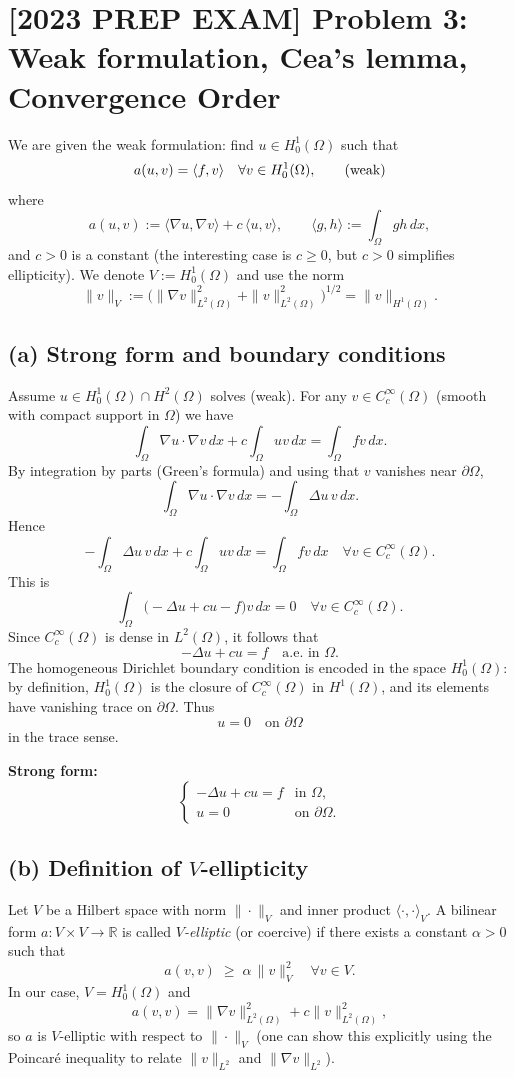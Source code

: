 \section*{[2023 PREP EXAM] Problem 3: Weak formulation, Cea's lemma, Convergence Order}
We are given the weak formulation: find $u \in H^1_0(\Omega)$ such that
\[
  a(u,v) = \langle f,v\rangle
  \quad \forall v \in H^1_0(\Omega), \tag{\text{weak}}
\]
where
\[
  a(u,v) := \langle \nabla u,\nabla v\rangle + c \,\langle u,v\rangle,
  \qquad
  \langle g,h\rangle := \int_\Omega g h \, dx,
\]
and $c > 0$ is a constant (the interesting case is $c \ge 0$, but $c>0$ simplifies
ellipticity).
We denote $V := H^1_0(\Omega)$ and use the norm
\[
  \|v\|_V := \bigl(\|\nabla v\|_{L^2(\Omega)}^2 + \|v\|_{L^2(\Omega)}^2\bigr)^{1/2}
  = \|v\|_{H^1(\Omega)}.
\]
\subsection*{(a) Strong form and boundary conditions}
Assume $u \in H^1_0(\Omega) \cap H^2(\Omega)$ solves (weak).
For any $v \in C_c^\infty(\Omega)$ (smooth with compact support in $\Omega$)
we have
\[
  \int_\Omega \nabla u \cdot \nabla v \, dx
  + c \int_\Omega u v \, dx
  = \int_\Omega f v \, dx.
\]
By integration by parts (Green's formula) and using that $v$ vanishes near
$\partial\Omega$,
\[
  \int_\Omega \nabla u \cdot \nabla v \, dx
  = - \int_\Omega \Delta u \, v \, dx.
\]
Hence
\[
  -\int_\Omega \Delta u \, v \, dx
  + c \int_\Omega u v \, dx
  = \int_\Omega f v \, dx
  \quad \forall v \in C_c^\infty(\Omega).
\]
This is
\[
  \int_\Omega \bigl(-\Delta u + c u - f\bigr) v \, dx = 0
  \quad \forall v \in C_c^\infty(\Omega).
\]
Since $C_c^\infty(\Omega)$ is dense in $L^2(\Omega)$, it follows that
\[
  -\Delta u + c u = f \quad \text{a.e. in } \Omega.
\]
The homogeneous Dirichlet boundary condition is encoded in the space
$H^1_0(\Omega)$: by definition, $H^1_0(\Omega)$ is the closure of
$C_c^\infty(\Omega)$ in $H^1(\Omega)$, and its elements have vanishing trace on
$\partial \Omega$. Thus
\[
  u = 0 \quad \text{on } \partial\Omega
\]
in the trace sense.

\textbf{Strong form:}
\[
  \boxed{
    \begin{cases}
      -\Delta u + c u = f & \text{in } \Omega,         \\
      u = 0               & \text{on } \partial\Omega.
    \end{cases}
  }
\]
\subsection*{(b) Definition of $V$-ellipticity}
Let $V$ be a Hilbert space with norm $\|\cdot\|_V$ and inner product
$\langle \cdot,\cdot \rangle_V$.
A bilinear form $a : V \times V \to \mathbb{R}$ is called \emph{$V$-elliptic}
(or coercive) if there exists a constant $\alpha > 0$ such that
\[
  a(v,v) \;\ge\; \alpha \, \|v\|_V^2
  \quad \forall v \in V.
\]
In our case, $V = H^1_0(\Omega)$ and
\[
  a(v,v)
  = \|\nabla v\|_{L^2(\Omega)}^2 + c \|v\|_{L^2(\Omega)}^2,
\]
so $a$ is $V$-elliptic with respect to $\|\cdot\|_V$ (one can show this
explicitly using the Poincaré inequality to relate $\|v\|_{L^2}$ and
$\|\nabla v\|_{L^2}$).

